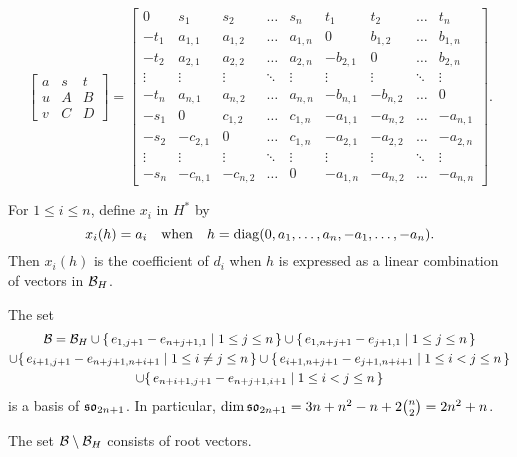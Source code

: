 \begin{equation}
  \label{eq:bigmat}
  \begin{bmatrix}
    a&s&t\\ u&A&B\\ v&C& D
  \end{bmatrix}
  =
  \begin{bmatrix}
    0&s_1&s_2&\dots&s_n &t_1&t_2&\dots&t_n\\
    -t_1& a_{1,1}&a_{1,2}&\dots&a_{1,n}&0&b_{1,2}&\dots&b_{1,n} \\
    -t_2& a_{2,1}&a_{2,2}&\dots&a_{2,n}&-b_{2,1}&0&\dots&b_{2,n} \\
    \vdots&\vdots&\vdots&\ddots&\vdots&\vdots&\vdots&\ddots&\vdots \\
    -t_n& a_{n,1}&a_{n,2}&\dots&a_{n,n}&-b_{n,1}&-b_{n,2}&\dots&0 \\
    -s_1& 0&c_{1,2}&\dots&c_{1,n}&-a_{1,1}&-a_{n,2}&\dots&-a_{n,1} \\
    -s_2& -c_{2,1}&0&\dots&c_{1,n}&-a_{2,1}&-a_{2,2}&\dots&-a_{2,n} \\
    \vdots & \vdots&\vdots&\ddots&\vdots&\vdots&\vdots&\ddots&\vdots \\
    -s_n& -c_{n,1}&-c_{n,2}&\dots&0&-a_{1,n}&-a_{n,2}&\dots&-a_{n,n}
  \end{bmatrix}.
\end{equation}

For $1\leq i\leq n$, define $x_i$ in $H^*$ by
\[
x_i(h)= a_i\quad\text{when}\quad h={\operatorname{diag}(0,a_1,\dots,a_n, -a_1,\dots,-a_n)}.
\]
Then $x_i(h)$ is the coefficient of $d_i$ when $h$ is expressed as a linear
combination of vectors in ${\mathcal B}_H$.

The set
\begin{multline*}
  {\mathcal B}={\mathcal B}_H \cup \{\, e_{1, j+1}-e_{n+j+1,1}\mid 1\leq j\leq n\,\} \cup \{\,
  e_{1, n+j+1}-e_{j+1,1}\mid 1\leq j\leq n\,\} \\
  \cup \{\, e_{i+1,j+1} -e_{n+j+1, n+i+1} \mid 1\leq i\ne j\leq n\,\} \cup
  \{\, e_{i+1,n+j+1} -e_{j+1, n+i+1} \mid 1\leq i< j\leq n\,\}  \\
  \cup \{\, e_{n+i+1,j+1} -e_{n+j+1, i+1}\mid 1\leq i< j\leq n\,\}
\end{multline*}
is a basis of $\mathfrak {so}_{2n+1}$. In particular, $\dim \mathfrak {so}_{2n+1}=
3n+n^2-n+2\binom n2= 2n^2+n$.

\begin{proposition}
  The set ${\mathcal B}\setminus {\mathcal B}_H$ consists of root vectors.
\end{proposition}

